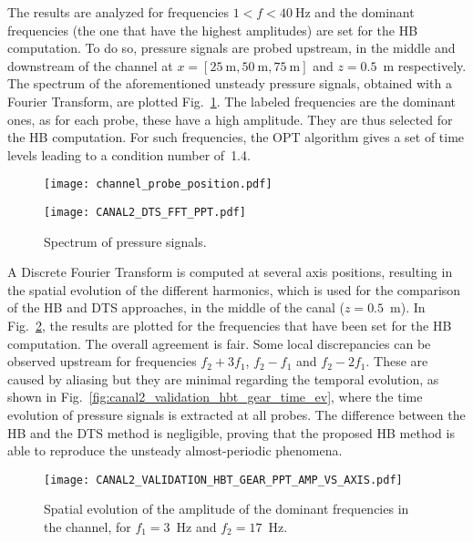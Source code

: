 The results are analyzed for frequencies $1<f< 40~\textrm{Hz}$ and the
dominant frequencies (the one that have the highest amplitudes) are
set for the HB computation.  To do so, pressure signals are probed
upstream, in the middle and downstream of the channel at
$x=[25~\textrm{m}, 50~\textrm{m}, 75~\textrm{m}]$ and $z=0.5$~m
respectively.  The spectrum of the aforementioned unsteady pressure
signals, obtained with a Fourier Transform, are plotted
Fig.~\ref{fig:canal2_dts_fft}.  The labeled frequencies are the
dominant ones, as for each probe, these have a high amplitude. They
are thus selected for the HB computation.  For such frequencies, the
OPT algorithm gives a set of time levels leading to a condition number
of~1.4.
\begin{figure}[htb]
  \centering
  \texttt{[image: channel\_probe\_position.pdf]}

  \vspace{1em}

  \texttt{[image: CANAL2\_DTS\_FFT\_PPT.pdf]}
  \caption{Spectrum of pressure signals.}
  \label{fig:canal2_dts_fft}
\end{figure}

A Discrete Fourier Transform is computed at several axis positions,
resulting in the spatial evolution of the different harmonics, which
is used for the comparison of the HB and DTS approaches, in the middle
of the canal ($z = 0.5$~m).  In
Fig.~\ref{fig:canal2_validation_hbt_gear_amp_vs_axis}, the results are
plotted for the frequencies that have been set for the HB computation.
The overall agreement is fair.  Some local discrepancies can be
observed upstream for frequencies $f_2 + 3f_1$, $f_2 - f_1$ and $f_2 -
2f_1$. These are caused by aliasing
 but they are minimal regarding the temporal evolution, as
shown in Fig.~\ref{fig:canal2_validation_hbt_gear_time_ev}, where the
time evolution of pressure signals is extracted at all probes.  The
difference between the HB and the DTS method is negligible, proving
that the proposed HB method is able to reproduce the unsteady
almost-periodic phenomena.
\begin{figure}[htbp]
  \centering
  \texttt{[image: CANAL2\_VALIDATION\_HBT\_GEAR\_PPT\_AMP\_VS\_AXIS.pdf]}
  \caption{Spatial evolution of the amplitude of the dominant
    frequencies in the channel, for $f_1 = 3$~Hz and $f_2 = 17$~Hz.}
  \label{fig:canal2_validation_hbt_gear_amp_vs_axis}
\end{figure}

